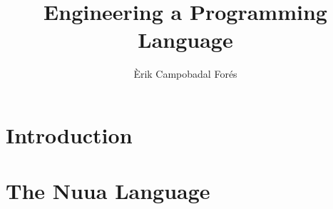 \documentclass[12pt]{report}
\title{Engineering a Programming Language}
\author{Èrik Campobadal Forés}
\begin{document}


\tableofcontents
\listoffigures

\chapter{Introduction}


\chapter{The Nuua Language}

\end{document}
